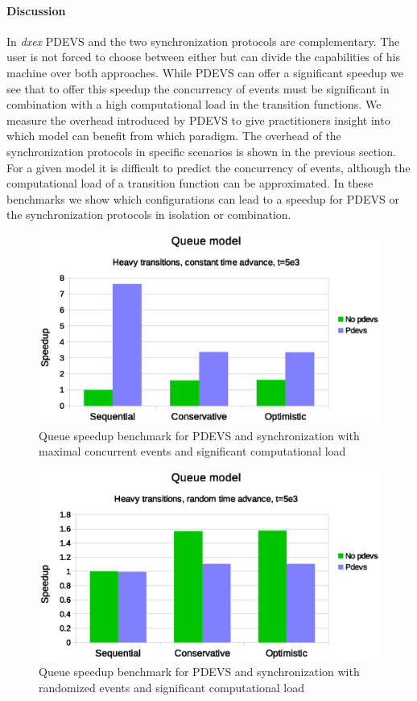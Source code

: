 \paragraph{Discussion}
In \textit{dxex} PDEVS and the two synchronization protocols are complementary. The user is not forced to choose between either but can divide the capabilities of his machine over both approaches.
While PDEVS can offer a significant speedup we see that to offer this speedup the concurrency of events must be significant in combination with a high computational load in the transition functions. 
We measure the overhead introduced by PDEVS to give practitioners insight into which model can benefit from which paradigm.
The overhead of the synchronization protocols in specific scenarios  is shown in the previous section.
For a given model it is difficult to predict the concurrency of events, although the computational load of a transition function can be approximated.
In these benchmarks we show which configurations can lead to a speedup for PDEVS or the synchronization protocols in isolation or combination.


\begin{figure}
	\center
	\includegraphics[width=\columnwidth]{fig/pdevs_fixed_sleep.eps}
	\caption{Queue speedup benchmark for PDEVS and synchronization with maximal concurrent events and significant computational load}
	\label{fig:pdevs_plot_fixed_sleep}
\end{figure}

\begin{figure}
	\center
	\includegraphics[width=\columnwidth]{fig/pdevs_random_sleep.eps}
	\caption{Queue speedup benchmark for PDEVS and synchronization with randomized events and significant computational load}
	\label{fig:pdevs_plot_random_sleep}
\end{figure}

